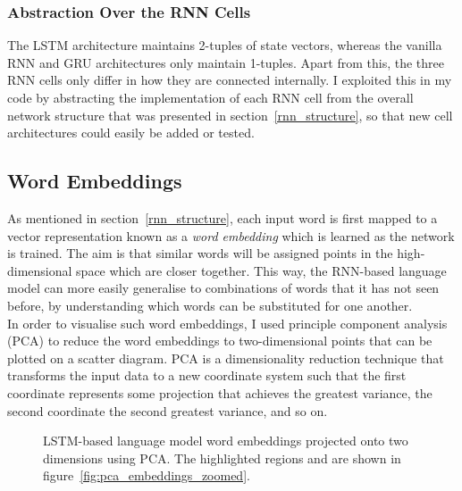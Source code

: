 \documentclass[a4paper, 12pt]{report}
\newcommand{\tit}[1]{\textit{#1}}
\begin{document}
\subsubsection{Abstraction Over the RNN Cells}

The LSTM architecture maintains 2-tuples of state vectors, whereas the vanilla RNN and GRU architectures only maintain 1-tuples. Apart from this, the three RNN cells only differ in how they are connected internally. I exploited this in my code by abstracting the implementation of each RNN cell from the overall network structure that was presented in section~\ref{rnn_structure}, so that new cell architectures could easily be added or tested.

\subsection{Word Embeddings} \label{embeddings}

As mentioned in section~\ref{rnn_structure}, each input word is first mapped to a vector representation known as a \tit{word embedding} which is learned as the network is trained. The aim is that similar words will be assigned points in the high-dimensional space which are closer together. This way, the RNN-based language model can more easily generalise to combinations of words that it has not seen before, by understanding which words can be substituted for one another. \\

In order to visualise such word embeddings, I used principle component analysis (PCA) to reduce the word embeddings to two-dimensional points that can be plotted on a scatter diagram. PCA is a dimensionality reduction technique that transforms the input data to a new coordinate system such that the first coordinate represents some projection that achieves the greatest variance, the second coordinate the second greatest variance, and so on.

\begin{figure}[h]
\captionsetup{justification=centering}
\centering
{}
\caption{LSTM-based language model word embeddings projected onto two dimensions using PCA. The highlighted regions and are shown in figure~\ref{fig:pca_embeddings_zoomed}.}
\label{fig:pca_embeddings_all}
\end{figure}
\end{document}
